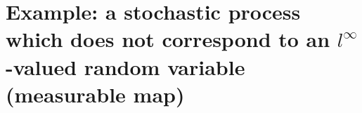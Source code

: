 

\section{Example: a stochastic process
which does not correspond to
an $l^{\infty}$-valued random variable (measurable map)}
\setcounter{theorem}{0}
\setcounter{equation}{0}


\renewcommand{\theenumi}{\roman{enumi}}
\renewcommand{\labelenumi}{\textnormal{(\theenumi)}$\;\;$}


